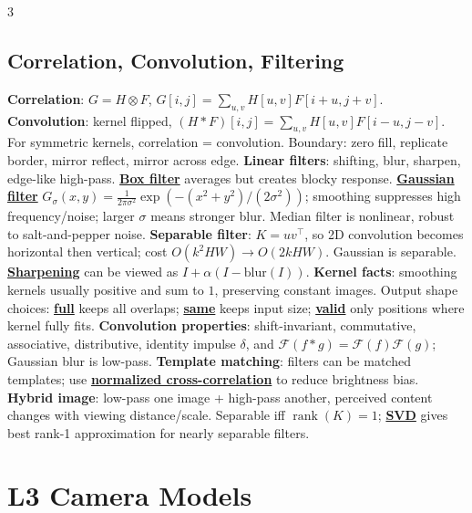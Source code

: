 \documentclass{article}
\numberwithin{equation}{subsection}
\newcommand{\key}[1]{\textbf{#1}}
\newcommand{\lowterm}[1]{\textbf{\underline{#1}}}
\begin{document}
\begin{multicols*}{3}
\subsection{Correlation, Convolution, Filtering}
\key{Correlation}: $G=H\otimes F$, $G[i,j]=\sum_{u,v}H[u,v]F[i+u,j+v]$. \key{Convolution}: kernel flipped, $(H*F)[i,j]=\sum_{u,v}H[u,v]F[i-u,j-v]$. For symmetric kernels, correlation = convolution. Boundary: zero fill, replicate border, mirror reflect, mirror across edge.
\key{Linear filters}: shifting, blur, sharpen, edge-like high-pass. \lowterm{Box filter} averages but creates blocky response. \lowterm{Gaussian filter}
$G_\sigma(x,y)=\frac{1}{2\pi\sigma^2}\exp(-(x^2+y^2)/(2\sigma^2))$; smoothing suppresses high frequency/noise; larger $\sigma$ means stronger blur. Median filter is nonlinear, robust to salt-and-pepper noise.
\key{Separable filter}: $K=uv^\top$, so 2D convolution becomes horizontal then vertical; cost $O(k^2HW)\to O(2kHW)$. Gaussian is separable. \lowterm{Sharpening} can be viewed as $I+\alpha(I-\mathrm{blur}(I))$.
\key{Kernel facts}: smoothing kernels usually positive and sum to $1$, preserving constant images. Output shape choices: \lowterm{full} keeps all overlaps; \lowterm{same} keeps input size; \lowterm{valid} only positions where kernel fully fits. \key{Convolution properties}: shift-invariant, commutative, associative, distributive, identity impulse $\delta$, and $\mathcal F(f*g)=\mathcal F(f)\mathcal F(g)$; Gaussian blur is low-pass. \key{Template matching}: filters can be matched templates; use \lowterm{normalized cross-correlation} to reduce brightness bias. \key{Hybrid image}: low-pass one image + high-pass another, perceived content changes with viewing distance/scale. Separable iff $\operatorname{rank}(K)=1$; \lowterm{SVD} gives best rank-1 approximation for nearly separable filters.

\section{L3 Camera Models}

\end{multicols*}
\end{document}
